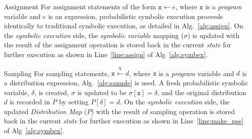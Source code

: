 \begin{paragraph}{Assignment}
	For assignment statements of the form $\mathtt{x} \leftarrow e$, where $\mathtt{x}$ is a \textit{program} variable and $e$ is an expression, probabilistic symbolic execution proceeds identically to traditional symbolic execution, as detailed in Alg.~\ref{alg:assign}.
	On the \textit{symbolic execution} side, the \textit{symbolic variable} mapping ($\sigma$) is updated with the result of the assignment operation is stored back in the current \textit{state} for further execution as shown in Line~\ref{line:assign} of Alg~\ref{alg:symbex}.
\end{paragraph}

\begin{algorithm}
	\caption{PSE Sampling Algorithm}
	\label{alg:sample}
	\begin{algorithmic}[1]
		\State{$\sigma[\mathtt{x}] = \delta$}
		\State{}
		\EndFunction
	\end{algorithmic}
\end{algorithm}

\begin{paragraph}{Sampling}
	For sampling statements, $\mathtt{x} \xleftarrow{\$} d$, where $\mathtt{x}$ is a \textit{program} variable and $d$ is a distribution expression, Alg.~\ref{alg:sample} is used.
	A fresh probabilistic symbolic variable, $\delta$, is created, $\sigma$ is updated to be $\sigma[\mathtt{x}] = \delta$, and the original distribution $d$ is recorded in $P$ by setting $P[\delta] = d$.
	On the \textit{symbolic execution} side, the updated \textit{Distribution Map} ($P$) with the result of sampling operation is stored back in the current \textit{state} for further execution as shown in Line~\ref{line:make_pse} of Alg~\ref{alg:symbex}.  
\end{paragraph}

\begin{algorithm}
	\caption{PSE Branch Algorithm}
	\label{alg:branch}
	\begin{algorithmic}[1]
		\State{}
		\EndFunction
	\end{algorithmic}
\end{algorithm}

